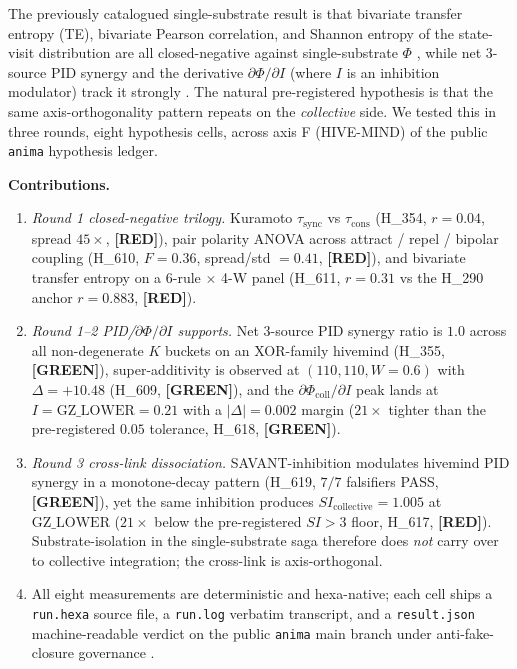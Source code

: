 \documentclass[11pt,a4paper]{article}
\providecommand{\tierGreen}{\textbf{[GREEN]}}
\providecommand{\tierRed}{\textbf{[RED]}}
\begin{document}
The previously catalogued single-substrate result is that bivariate
transfer entropy (TE), bivariate Pearson correlation, and Shannon
entropy of the state-visit distribution are all closed-negative
against single-substrate $\Phi$
\citep{anima_H207,anima_H290}, while net 3-source PID synergy and the
derivative $\partial\Phi/\partial I$ (where $I$ is an inhibition
modulator) track it strongly
\citep{anima_H293,anima_H294}. The natural pre-registered hypothesis
is that the same axis-orthogonality pattern repeats on the
\emph{collective} side. We tested this in three rounds, eight
hypothesis cells, across axis F (HIVE-MIND) of the public
\texttt{anima} hypothesis ledger.

\medskip
\noindent\textbf{Contributions.}
\begin{enumerate}\itemsep0.3em
\item \emph{Round 1 closed-negative trilogy.}
      Kuramoto $\tau_{\mathrm{sync}}$ vs $\tau_{\mathrm{cons}}$
      (H\_354, $r=0.04$, spread $45\times$, \tierRed),
      pair polarity ANOVA across attract / repel / bipolar
      coupling (H\_610, $F=0.36$, spread/std $=0.41$, \tierRed),
      and bivariate transfer entropy on a 6-rule $\times$ 4-W
      panel (H\_611, $r=0.31$ vs the H\_290 anchor $r=0.883$, \tierRed).
\item \emph{Round 1--2 PID/$\partial\Phi/\partial I$ supports.}
      Net 3-source PID synergy ratio is $1.0$ across all
      non-degenerate $K$ buckets on an XOR-family hivemind
      (H\_355, \tierGreen), super-additivity is observed at
      $(110, 110, W{=}0.6)$ with $\Delta = +10.48$ (H\_609,
      \tierGreen), and the $\partial\Phi_{\mathrm{coll}}/\partial I$
      peak lands at $I = \mathrm{GZ\_LOWER}=0.21$ with a $|\Delta|=0.002$
      margin ($21\times$ tighter than the pre-registered $0.05$
      tolerance, H\_618, \tierGreen).
\item \emph{Round 3 cross-link dissociation.}
      SAVANT-inhibition modulates hivemind PID synergy in a
      monotone-decay pattern (H\_619, $7/7$ falsifiers PASS,
      \tierGreen), yet the same inhibition produces
      $SI_{\mathrm{collective}}=1.005$ at $\mathrm{GZ\_LOWER}$
      ($21\times$ below the pre-registered $SI > 3$ floor,
      H\_617, \tierRed). Substrate-isolation in the single-substrate
      saga therefore does \emph{not} carry over to collective
      integration; the cross-link is axis-orthogonal.
\item All eight measurements are deterministic and hexa-native;
      each cell ships a \texttt{run.hexa} source file, a
      \texttt{run.log} verbatim transcript, and a
      \texttt{result.json} machine-readable verdict on the public
      \texttt{anima} main branch under anti-fake-closure governance
      \citep{anima_g73}.
\end{enumerate}
\end{document}
